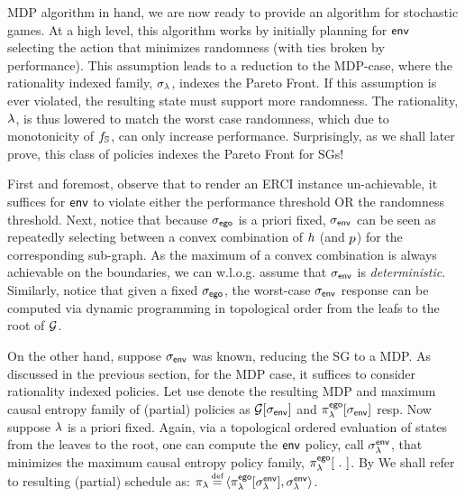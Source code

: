 MDP algorithm in hand, we are now ready to provide an algorithm for
stochastic games. At a high level, this algorithm works by initially
planning for $\mathsf{env}$ selecting the action that minimizes randomness
(with ties broken by performance). This assumption leads to a
reduction to the MDP-case, where the rationality indexed family,
$\sigma_\lambda$, indexes the Pareto Front.  If this assumption is ever
violated, the resulting state must support more randomness.  The
rationality, $\lambda$, is thus lowered to match the worst case randomness,
which due to monotonicity of $f_\mathbb{S}$, can only increase
performance. Surprisingly, as we shall later prove, this class of
policies indexes the Pareto Front for SGs!

First and foremost, observe that to render an ERCI instance
un-achievable, it suffices for $\mathsf{env}$ to violate
either the performance threshold OR the randomness threshold.  Next,
notice that because ${\sigma_{\mathsf{ego}}}$ is a priori fixed, ${\sigma_{\mathsf{env}}}$ can
be seen as repeatedly selecting between a convex combination of
$h$ (and $p$) for the corresponding sub-graph. As the maximum of a
convex combination is always achievable on the boundaries, we can
w.l.o.g. assume that ${\sigma_{\mathsf{env}}}$ is \emph{deterministic}.  Similarly,
notice that given a fixed ${\sigma_{\mathsf{ego}}}$, the worst-case ${\sigma_{\mathsf{env}}}$
response can be computed via dynamic programming in topological order
from the leafs to the root of $\mathcal{G}$.

On the other hand, suppose ${\sigma_{\mathsf{env}}}$ was known, reducing the SG to
a MDP. As discussed in the previous section, for the MDP case, it
suffices to consider rationality indexed policies. Let use denote the
resulting MDP and maximum causal entropy family of (partial) policies
as $\mathcal{G}[{\sigma_{\mathsf{env}}}]$ and $\pi^{\mathsf{ego}}_\lambda[{\sigma_{\mathsf{env}}}]$ resp. Now
suppose $\lambda$ is a priori fixed. Again, via a topological ordered
evaluation of states from the leaves to the root, one can compute the
$\mathsf{env}$ policy, call $\sigma_\lambda^{\mathsf{env}}$, that minimizes the maximum
causal entropy policy family, $\pi^{\mathsf{ego}}_\lambda[~.~]$. By
We shall refer to resulting (partial) schedule as: $\pi_\rat \eqdef \langle
\pi^\pOne_\rat[\sched_\rat^\pTwo] , \sched_\rat^\pTwo \rangle$.

